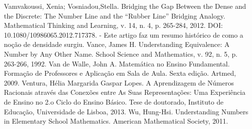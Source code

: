 \begin{thebibliography}{9}
      Vamvakoussi, Xenia; Vosniadou,Stella. Bridging the Gap Between the Dense and the Discrete: The Number Line and the “Rubber Line” Bridging Analogy. Mathematical Thinking and Learning, v. 14, n. 4, p. 265-284, 2012. DOI: 10.1080/10986065.2012.717378. - Este artigo faz um resumo histórico de como a noção de densidade surgiu.
    Vance, James H. Understanding Equivalence: A Number by Any Other Name. School Science and Mathematics, v. 92, n. 5, p. 263-266, 1992.
    Van de Walle, John A. Matemática no Ensino Fundamental. Formação de Professores e Aplicação em Sala de Aula. Sexta edição. Artmed, 2009.
    Ventura, Hélia Margarida Gaspar Lopes. A Aprendizagem de Números Racionais através das Conexões entre As Suas Representações: Uma Experiência de Ensino no 2.o Ciclo do Ensino Básico. Tese de doutorado, Instituto de Educação, Universidade de Lisboa, 2013.
     Wu, Hung-Hsi. Understanding Numbers in Elementary School Mathematics. American Mathematical Society, 2011.
\end{thebibliography}

